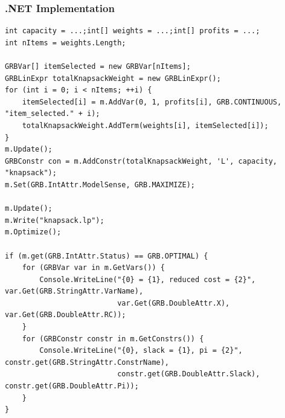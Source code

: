 \documentclass[12pt,handout]{beamer}
\begin{document}
\begin{frame} [containsverbatim]
\frametitle{.NET Implementation}
\tiny
\begin{verbatim}
int capacity = ...;int[] weights = ...;int[] profits = ...;
int nItems = weights.Length;

GRBVar[] itemSelected = new GRBVar[nItems];
GRBLinExpr totalKnapsackWeight = new GRBLinExpr();
for (int i = 0; i < nItems; ++i) {
    itemSelected[i] = m.AddVar(0, 1, profits[i], GRB.CONTINUOUS, "item_selected." + i);
    totalKnapsackWeight.AddTerm(weights[i], itemSelected[i]);
}
m.Update();
GRBConstr con = m.AddConstr(totalKnapsackWeight, 'L', capacity, "knapsack");
m.Set(GRB.IntAttr.ModelSense, GRB.MAXIMIZE);

m.Update();
m.Write("knapsack.lp");
m.Optimize();

if (m.get(GRB.IntAttr.Status) == GRB.OPTIMAL) {
    for (GRBVar var in m.GetVars()) {
        Console.WriteLine("{0} = {1}, reduced cost = {2}", var.Get(GRB.StringAttr.VarName),
                          var.Get(GRB.DoubleAttr.X), var.Get(GRB.DoubleAttr.RC));
    }
    for (GRBConstr constr in m.GetConstrs()) {
        Console.WriteLine("{0}, slack = {1}, pi = {2}", constr.get(GRB.StringAttr.ConstrName),
                          constr.get(GRB.DoubleAttr.Slack), constr.get(GRB.DoubleAttr.Pi));
    }
}
\end{verbatim}
\end{frame}

\end{document}
